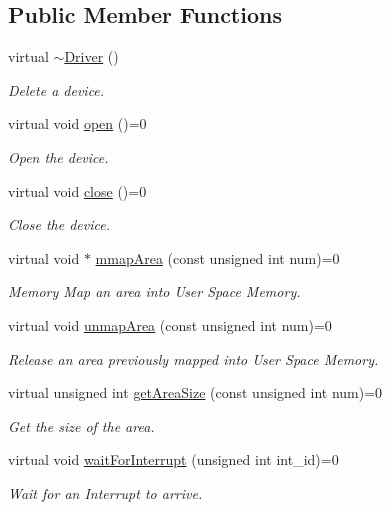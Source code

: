 \subsection*{Public Member Functions}
\begin{CompactItemize}
\item 
virtual \hyperlink{classmprace_1_1Driver_a0}{$\sim$Driver} ()
\begin{CompactList}\small\item\em Delete a device. \item\end{CompactList}\item 
virtual void \hyperlink{classmprace_1_1Driver_a1}{open} ()=0
\begin{CompactList}\small\item\em Open the device. \item\end{CompactList}\item 
virtual void \hyperlink{classmprace_1_1Driver_a2}{close} ()=0
\begin{CompactList}\small\item\em Close the device. \item\end{CompactList}\item 
virtual void $\ast$ \hyperlink{classmprace_1_1Driver_a3}{mmap\-Area} (const unsigned int num)=0
\begin{CompactList}\small\item\em Memory Map an area into User Space Memory. \item\end{CompactList}\item 
virtual void \hyperlink{classmprace_1_1Driver_a4}{unmap\-Area} (const unsigned int num)=0
\begin{CompactList}\small\item\em Release an area previously mapped into User Space Memory. \item\end{CompactList}\item 
virtual unsigned int \hyperlink{classmprace_1_1Driver_a5}{get\-Area\-Size} (const unsigned int num)=0
\begin{CompactList}\small\item\em Get the size of the area. \item\end{CompactList}\item 
virtual void \hyperlink{classmprace_1_1Driver_a6}{wait\-For\-Interrupt} (unsigned int int\_\-id)=0
\begin{CompactList}\small\item\em Wait for an Interrupt to arrive. \item\end{CompactList}\end{CompactItemize}


